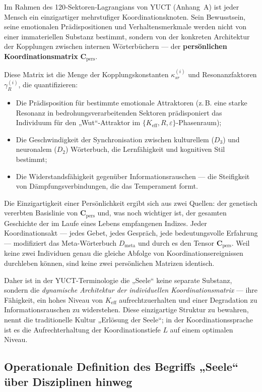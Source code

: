 \documentclass[12pt,a4paper]{article}
\begin{document}
	Im Rahmen des 120‑Sektoren‑Lagrangians von YUCT (Anhang~A) ist jeder Mensch ein einzigartiger mehrstufiger Koordinationsknoten. Sein Bewusstsein, seine emotionalen Prädispositionen und Verhaltensmerkmale werden nicht von einer immateriellen Substanz bestimmt, sondern von der konkreten Architektur der Kopplungen zwischen internen Wörterbüchern — der \textbf{persönlichen Koordinationsmatrix} \(\mathbf{C}_{\text{pers}}\).
	
	Diese Matrix ist die Menge der Kopplungskonstanten \(\kappa_{sr}^{(i)}\) und Resonanzfaktoren \(\gamma_{R}^{(i)}\), die quantifizieren:
	\begin{itemize}
		\item Die Prädisposition für bestimmte emotionale Attraktoren (z. B. eine starke Resonanz in bedrohungsverarbeitenden Sektoren prädisponiert das Individuum für den „Wut“-Attraktor im \(\{K_{\mathrm{eff}}, R, \varepsilon\}\)-Phasenraum);
		\item Die Geschwindigkeit der Synchronisation zwischen kulturellem (\(D_3\)) und neuronalem (\(D_2\)) Wörterbuch, die Lernfähigkeit und kognitiven Stil bestimmt;
		\item Die Widerstandsfähigkeit gegenüber Informationsrauschen — die Steifigkeit von Dämpfungsverbindungen, die das Temperament formt.
	\end{itemize}
	
	Die Einzigartigkeit einer Persönlichkeit ergibt sich aus zwei Quellen: der genetisch vererbten Basislinie von \(\mathbf{C}_{\text{pers}}\) und, was noch wichtiger ist, der gesamten Geschichte der im Laufe eines Lebens empfangenen Indizes. Jeder Koordinationsakt — jedes Gebet, jedes Gespräch, jede bedeutungsvolle Erfahrung — modifiziert das Meta-Wörterbuch \(D_{\text{meta}}\) und durch es den Tensor \(\mathbf{C}_{\text{pers}}\). Weil keine zwei Individuen genau die gleiche Abfolge von Koordinationsereignissen durchleben können, sind keine zwei persönlichen Matrizen identisch.
	
	Daher ist in der YUCT-Terminologie die „Seele“ keine separate Substanz, sondern die \emph{dynamische Architektur der individuellen Koordinationsmatrix} — ihre Fähigkeit, ein hohes Niveau von \(K_{\mathrm{eff}}\) aufrechtzuerhalten und einer Degradation zu Informationsrauschen zu widerstehen. Diese einzigartige Struktur zu bewahren, nennt die traditionelle Kultur „Erlösung der Seele“; in der Koordinationssprache ist es die Aufrechterhaltung der Koordinationstiefe \(L\) auf einem optimalen Niveau.
	
	\subsection{Operationale Definition des Begriffs „Seele“ über Disziplinen hinweg}
	\label{subsec:soul-definition}
	
\end{document}
